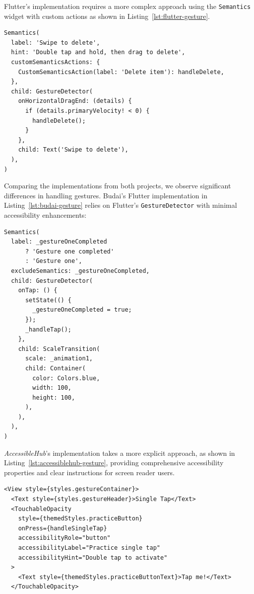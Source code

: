 {Flutter's implementation requires a more complex approach using the \texttt{Semantics} widget with custom actions as shown in Listing~\ref{lst:flutter-gesture}.

\begin{lstlisting}[style=DartStyle, caption=Accessible gesture handler in Flutter, label=lst:flutter-gesture]
Semantics(
  label: 'Swipe to delete',
  hint: 'Double tap and hold, then drag to delete',
  customSemanticsActions: {
    CustomSemanticsAction(label: 'Delete item'): handleDelete,
  },
  child: GestureDetector(
    onHorizontalDragEnd: (details) {
      if (details.primaryVelocity! < 0) {
        handleDelete();
      }
    },
    child: Text('Swipe to delete'),
  ),
)
\end{lstlisting}

\pagebreak

Comparing the implementations from both projects, we observe significant differences in handling gestures. Budai's Flutter implementation in Listing~\ref{lst:budai-gesture} relies on Flutter's \texttt{GestureDetector} with minimal accessibility enhancements:

\begin{lstlisting}[style=DartStyle, caption=Gesture handling in Budai's Flutter implementation, label=lst:budai-gesture]
Semantics(
  label: _gestureOneCompleted 
      ? 'Gesture one completed' 
      : 'Gesture one',
  excludeSemantics: _gestureOneCompleted,
  child: GestureDetector(
    onTap: () {
      setState(() {
        _gestureOneCompleted = true;
      });
      _handleTap();
    },
    child: ScaleTransition(
      scale: _animation1,
      child: Container(
        color: Colors.blue,
        width: 100,
        height: 100,
      ),
    ),
  ),
)
\end{lstlisting}

\pagebreak

\textit{AccessibleHub}'s implementation takes a more explicit approach, as shown in Listing~\ref{lst:accessiblehub-gesture}, providing comprehensive accessibility properties and clear instructions for screen reader users.

\begin{lstlisting}[style=ReactNativeStyle, caption=Gesture handling in \textit{AccessibleHub}'s React Native implementation, label=lst:accessiblehub-gesture]
<View style={styles.gestureContainer}>
  <Text style={styles.gestureHeader}>Single Tap</Text>
  <TouchableOpacity
    style={themedStyles.practiceButton}
    onPress={handleSingleTap}
    accessibilityRole="button"
    accessibilityLabel="Practice single tap"
    accessibilityHint="Double tap to activate"
  >
    <Text style={themedStyles.practiceButtonText}>Tap me!</Text>
  </TouchableOpacity>
  

\end{lstlisting}}
